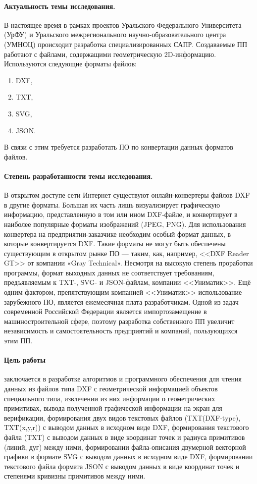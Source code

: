 \Introduction

\paragraph{Актуальность темы исследования.} В настоящее время в рамках проектов Уральского Федерального Университета (УрФУ) и Уральского межрегионального научно-образовательного центра (УМНОЦ) происходит разработка специализированных САПР. Создаваемые ПП работают с файлами, содержащими геометрическую 2D-информацию. Используются следующие форматы файлов:

\begin{enumerate}
	\item DXF,
	\item TXT,
	\item SVG,
	\item JSON.
\end{enumerate}

В связи с этим требуется разработать ПО по конвертации данных форматов файлов.

\paragraph{Степень разработанности темы исследования.} В открытом доступе сети Интернет существуют онлайн-конвертеры файлов DXF в другие форматы. Большая их часть лишь визуализирует графическую информацию, представленную в том или ином DXF-файле, и конвертирует в наиболее популярные форматы изображений (JPEG, PNG). Для использования конвертера на предприятии-заказчике необходим особый формат данных, в которые конвертируется DXF. Такие форматы не могут быть обеспечены существующим в открытом рынке ПО --- таким, как, например, <<DXF Reader GT>> от компании «Gray Technical». Несмотря на высокую степень проработки программы, формат выходных данных не соответствует требованиям, предъявляемым к TXT-, SVG- и JSON-файлам, компании <<Униматик>>. Ещё одним фактором, препятствующим компанией <<Униматик>> использование зарубежного ПО, является ежемесячная плата разработчикам. Одной из задач современной Российской Федерации является импортозамещение в машиностроительной сфере, поэтому разработка собственного ПП увеличит независимость и самостоятельность предприятий и компаний, пользующихся этим ПП.

\paragraph{Цель работы} заключается в разработке алгоритмов и программного обеспечения для чтения данных из файлов типа DXF с геометрической информацией объектов специального типа, извлечении из них информации о геометрических примитивах, вывода полученной графической информации на экран для верификации, формирования двух видов текстовых файлов (TXT(DXF-type), TXT(x,y,r)) с выводом данных в исходном виде DXF, формирования текстового файла (TXT) с выводом данных в виде координат точек и радиуса примитивов (линий, дуг) между ними, формировании файла-описания двумерной векторной графики в формате SVG с выводом данных в исходном виде DXF, формировании текстового файла формата JSON с выводом данных в виде координат точек и степенями кривизны примитивов между ними.

